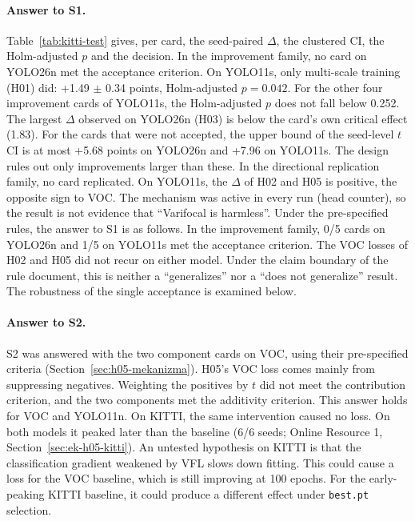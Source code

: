 \documentclass[pdflatex,iicol,sn-mathphys-num]{sn-jnl}
\begin{document}
\paragraph{Answer to S1.}
Table~\ref{tab:kitti-test} gives, per card, the seed-paired $\Delta$, the clustered CI, the Holm-adjusted $p$ and the decision. In the improvement family, no card on YOLO26n met the acceptance criterion. On YOLO11s, only multi-scale training (H01) did: +1.49 $\pm$ 0.34 points, Holm-adjusted $p=0.042$. For the other four improvement cards of YOLO11s, the Holm-adjusted $p$ does not fall below 0.252. The largest $\Delta$ observed on YOLO26n (H03) is below the card's own critical effect (1.83). For the cards that were not accepted, the upper bound of the seed-level $t$ CI is at most +5.68 points on YOLO26n and +7.96 on YOLO11s. The design rules out only improvements larger than these. In the directional replication family, no card replicated. On YOLO11s, the $\Delta$ of H02 and H05 is positive, the opposite sign to VOC. The mechanism was active in every run (head counter), so the result is not evidence that ``Varifocal is harmless''. Under the pre-specified rules, the answer to S1 is as follows. In the improvement family, 0/5 cards on YOLO26n and 1/5 on YOLO11s met the acceptance criterion. The VOC losses of H02 and H05 did not recur on either model. Under the claim boundary of the rule document, this is neither a ``generalizes'' nor a ``does not generalize'' result. The robustness of the single acceptance is examined below.

\paragraph{Answer to S2.}
S2 was answered with the two component cards on VOC, using their pre-specified criteria (Section~\ref{sec:h05-mekanizma}). H05's VOC loss comes mainly from suppressing negatives. Weighting the positives by $t$ did not meet the contribution criterion, and the two components met the additivity criterion. This answer holds for VOC and YOLO11n. On KITTI, the same intervention caused no loss. On both models it peaked later than the baseline (6/6 seeds; Online Resource 1, Section~\ref{sec:ek-h05-kitti}). An untested hypothesis on KITTI is that the classification gradient weakened by VFL slows down fitting. This could cause a loss for the VOC baseline, which is still improving at 100 epochs. For the early-peaking KITTI baseline, it could produce a different effect under \texttt{best.pt} selection.
\end{document}

